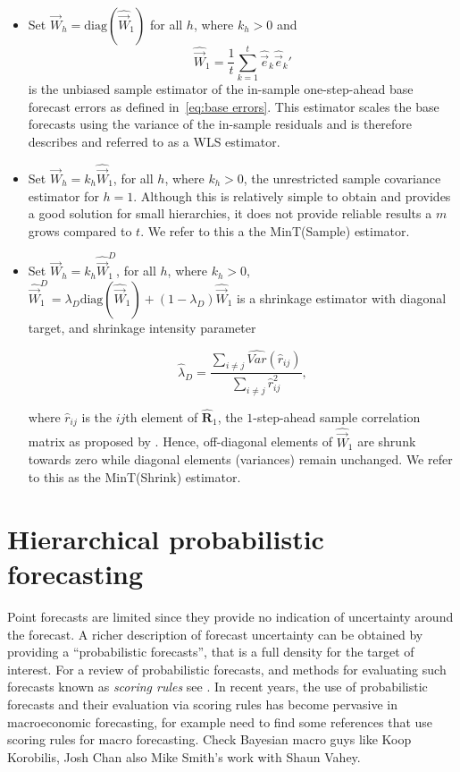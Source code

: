 \documentclass[graybox]{svmult}
\begin{document}
\begin{itemize}
    \item Set ${\vec{W}}_{h}=\text{diag}(\hat{\vec{W}}_{1})$ for all $h$, where $k_{h} > 0$ and
        $$
        \hat{\vec{W}}_{1} = \frac{1}{t}\sum_{k=1}^{t} \hat{\vec{e}}_{k}\hat{\vec{e}}_{k}'
        $$
        is the unbiased sample estimator of the in-sample one-step-ahead base forecast errors as defined in~\eqref{eq:base errors}. This estimator scales the base forecasts using the variance of the in-sample residuals and is therefore describes and referred to as a WLS estimator.
    \item  Set $\vec{W}_{h}=k_{h}\hat{\vec{W}}_{1}$, for all $h$, where $k_{h} > 0$, the unrestricted sample covariance estimator for $h=1$. Although this is relatively simple to obtain and provides a good solution for small hierarchies, it does not provide reliable results a $m$ grows compared to $t$. We refer to this a the MinT(Sample) estimator.
    \item Set $\vec{W}_{h}=k_{h}\hat{\vec{W}}_{1}^D$, for all $h$, where $k_{h} > 0$, $\hat{\vec{W}}^{D}_{1} = \lambda_{D} \text{diag}(\hat{\vec{W}}_{1}) + (1 - \lambda_{D})\hat{\vec{W}}_{1}$ is a shrinkage estimator with diagonal target, and shrinkage intensity parameter

        $$\hat{\lambda}_{D} = \frac{\sum_{i \ne j}\hat{Var}(\hat{r}_{ij})}{\sum_{i \ne j}\hat{r}_{ij}^2},$$


        where $\hat{r}_{ij}$ is the $ij$th element of $\hat{\bm{R}}_{1}$, the $1$-step-ahead sample correlation matrix as proposed by \citet{Schafer2005}. Hence, off-diagonal elements of $\hat{\vec{W}}_1$ are shrunk towards zero while diagonal elements (variances) remain unchanged. We refer to this as the MinT(Shrink) estimator.
\end{itemize}

\section{Hierarchical probabilistic forecasting}

Point forecasts are limited since they provide no indication of uncertainty around the forecast. A richer description of forecast uncertainty can be obtained by providing a ``probabilistic forecasts'', that is a full density for the target of interest. For a review of probabilistic forecasts, and methods for evaluating such forecasts known as {\em scoring rules} see  \citep{Gneiting2014}. In recent years, the use of probabilistic forecasts and their evaluation via scoring rules has become pervasive in macroeconomic forecasting, for example {\color{red} need to find some references that use scoring rules for macro forecasting.  Check Bayesian macro guys like Koop Korobilis, Josh Chan also Mike Smith's work with Shaun Vahey}.
\end{document}
